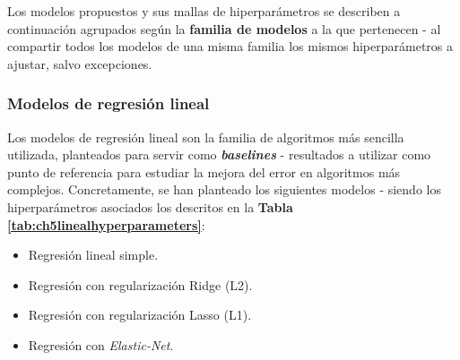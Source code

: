 Los modelos propuestos y sus mallas de hiperparámetros se describen a continuación agrupados según la \textbf{familia de modelos} a la que pertenecen - al compartir todos los modelos de una misma familia los mismos hiperparámetros a ajustar, salvo excepciones.

\subsubsection{Modelos de regresión lineal}

Los modelos de regresión lineal son la familia de algoritmos más sencilla utilizada, planteados para servir como \textbf{\textit{baselines}} - resultados a utilizar como punto de referencia para estudiar la mejora del error en algoritmos más complejos. Concretamente, se han planteado los siguientes modelos - siendo los hiperparámetros asociados los descritos en la \textbf{Tabla \ref{tab:ch5linealhyperparameters}}:

\begin{itemize}[parsep=1pt, itemsep=0pt, topsep=1pt]
	\item Regresión lineal simple.
	\item Regresión con regularización Ridge (L2).
	\item Regresión con regularización Lasso (L1).
	\item Regresión con \textit{Elastic-Net}.
\end{itemize}

